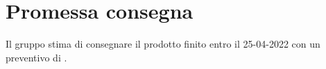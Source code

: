 \section{Promessa consegna}\label{section:promessa_consegna}

Il gruppo stima di consegnare il prodotto finito entro il 25-04-2022 con un preventivo di .
